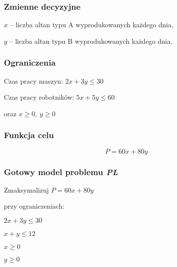 \subsubsection*{Zmienne decyzyjne}

$x$ – liczba altan typu A wyprodukowanych każdego dnia,

$y$ – liczba altan typu B wyprodukowanych każdego dnia.

\subsubsection*{Ograniczenia}

Czas pracy maszyn: $2x + 3y \leq 30$

Czas pracy robotników: $5x + 5y \leq 60$

oraz $x \geq 0, \ y \geq 0$


\subsubsection*{Funkcja celu}
\[
    P = 60x + 80y
\]

\subsubsection*{Gotowy model problemu \textit{PL}}
    Zmaksymalizuj $P = 60x + 80y$

przy ograniczeniach:

    $2x + 3y \leq 30$
    
    $x + y \leq 12$
    
    $x  \geq 0$
    
    $y \geq 0$





